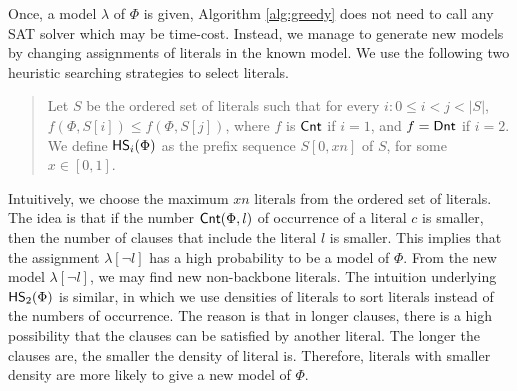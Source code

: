 Once, a model $\lambda$ of $\Phi$ is given, Algorithm \ref{alg:greedy} does not need to call any SAT solver which may be time-cost.
Instead, we manage to generate new models by changing assignments of literals in the known model.
We use the following two heuristic searching strategies to select literals. %
\begin{quote}
Let $S$ be the ordered set of literals such that for every $i: 0\leq i<j<|S|$,
$f(\Phi,S[i])\leq f(\Phi,S[j])$, where $f$ is $\textsf{Cnt}$ if $i=1$, and $f=\textsf{Dnt}$ if $i=2$.
We define ${\sf HS}_i(\Phi)$ as the prefix sequence $S[0,xn]$ of $S$, for some $x\in[0,1]$.
\end{quote}

Intuitively, we choose the maximum $xn$ literals from the ordered set of literals.
The idea is that if the number $\textsf{Cnt}(\Phi,l)$ of occurrence of a literal $c$ is smaller,
then the number of clauses that include the literal $l$ is smaller. This implies that the assignment $\lambda[\neg l]$ has a high probability to be a model of
$\Phi$. From the new model $\lambda[\neg l]$, we may find new non-backbone literals.
The intuition underlying ${\sf HS}_2(\Phi)$ is similar, in which we use densities of literals to sort literals instead of the numbers of occurrence.
The reason is that in longer clauses, there is a high possibility that the clauses can be satisfied by another literal. The longer the clauses are, the smaller the density of literal is. Therefore, literals with smaller density are more likely to give a new model of $\Phi$.








